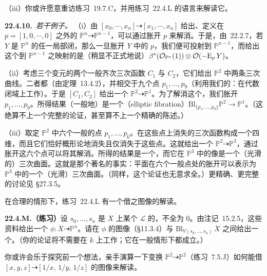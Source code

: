 （iii）你或许愿意重访\mbox{练习~19.7.C}，并用\mbox{练习~22.4.L} 的语言来解读它。

\textbf{22.4.10.}\ \emph{若干例子。}\quad
（i）由 $[x_0,\cdots,x_n]\dashrightarrow[x_1,\cdots,x_n]$ 给出、定义在 $p=[1,0,\cdots,0]$ 之外的\trRationalMap{} $\mathbb{P}^n\dashrightarrow\mathbb{P}^{n-1}$，可以通过胀开 $p$ 来解消。于是，由\mbox{\trBlowupClosureLemma~22.2.7}，若 $Y$ 是 $\mathbb{P}^n$ 的任一局部闭\trSubscheme，那么一旦胀开 $Y$ 中的 $p$，我们便可投射到 $\mathbb{P}^{n-1}$，而给出这个到 $\mathbb{P}^{n-1}$ 之映射的\trInvertibleSheaf{}是（稍显不正式地说）$\beta^*(\mathcal{O}_{\mathbb{P}^n}(1))\otimes\mathcal{O}(-\mathrm{E}_p\,Y)$。

（ii）考虑三个变元的两个一般齐次三次函数 $C_1$ 与 $C_2$，它们给出 $\mathbb{P}^2$ 中两条三次曲线。二者都\trSmooth{}（由\mbox{\trBertini{}定理~13.4.2}），并相交于九个点 $p_1,\dots,p_9$（利用我们的\trStandingHypothesis：在代数闭域上工作）。于是 $[C_1,C_2]$ 给出一个\trRationalMap{} $\mathbb{P}^2\dashrightarrow\mathbb{P}^1$。为了解消这个\trRationalMap，我们胀开 $p_1,\dots,p_9$。所得结果（一般地）是一个\emph{\trEllipticFibration}（elliptic fibration）$\mathrm{Bl}_{\{p_1,\dots,p_9\}}\mathbb{P}^2\to\mathbb{P}^1$。（这绝算不上一个完整的论证，甚至算不上一个精确的陈述。）

（iii）取定 $\mathbb{P}^2$ 中六个一般的点 $p_1,\dots,p_6$。在这些点上消失的三次函数构成一个四维\trVectorSpace，而且它们恰好概形论地消失且仅消失于这些点。这就给出一个\trRationalMap{} $\mathbb{P}^2\dashrightarrow\mathbb{P}^3$，通过胀开这六个点可以将其解消。所得的\trMorphism{}结果是一个\trClosedEmbedding，而它在 $\mathbb{P}^3$ 中的像是一个（光滑的）三次曲面。这就是那个著名的事实：平面在六个一般点处的胀开可以表示为 $\mathbb{P}^3$ 中的一个（光滑）三次曲面。（同样，这个论证也无意求全。）更精确、更完整的讨论见 \S27.3.5。

在合理的情形下，\mbox{练习~22.4.L} 有一个借\trRationalMap{}之图像的解读。

\textbf{22.4.M.（练习）}\quad 设 $s_0,\dots,s_n$ 是\trIntegral\trScheme{} $X$ 上某个\trInvertibleSheaf{} $\mathscr{L}$ 的\trSection，不全为 $0$。由\mbox{注记~15.2.5}，这些资料给出一个\trRationalMap{} $\phi\colon X\dashrightarrow\mathbb{P}^n$。请在 $\phi$ 的图像（\S11.3.4）与 $\mathrm{Bl}_{V(s_0,\dots,s_n)}\,X$ 之间给出一个\trIsomorphism。（你的论证将不需要在\trField{} $k$ 上工作；它在一般情形下都成立。）

你或许会乐于探究前一个想法，亲手演算一下\trCremona{}变换 $\mathbb{P}^2\dashrightarrow\mathbb{P}^2$（\mbox{练习~7.5.J}）如何能借\trRationalMap{} $[x,y,z]\dashrightarrow[1/x,\,1/y,\,1/z]$ 的图像来解读。

